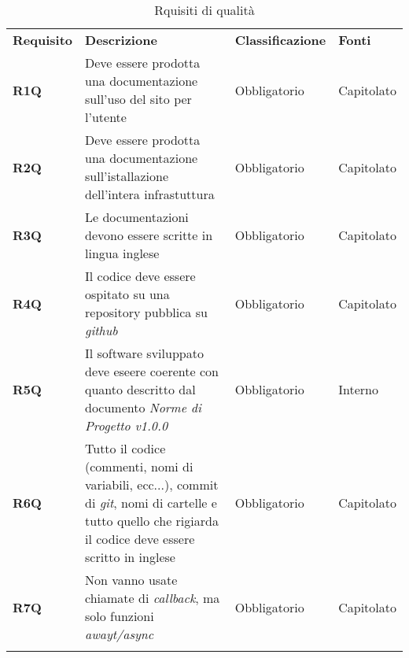 \begin{center}
    \centering
    \renewcommand{\arraystretch}{1.8}
    \label{tab:RequisitiQualita}
    \begin{longtable}[!h]{p{50px} p{200px} p{100px} p{50px}}
        \rowcolor{logo!70} \textbf{Requisito} & \textbf{Descrizione}                                                                                                                                        & \textbf{Classificazione} & \textbf{Fonti} \\
        \textbf{R1Q}                          & Deve essere prodotta una documentazione sull'uso del sito per l'utente                                                                                      & Obbligatorio             & Capitolato     \\
        \textbf{R2Q}                          & Deve essere prodotta una documentazione sull'istallazione dell'intera infrastuttura                                                                         & Obbligatorio             & Capitolato     \\
        \textbf{R3Q}                          & Le documentazioni devono essere scritte in lingua inglese                                                                                                   & Obbligatorio             & Capitolato     \\
        \textbf{R4Q}                          & Il codice deve essere ospitato su una repository pubblica su \textit{github}                                                                                        & Obbligatorio             & Capitolato     \\
        \textbf{R5Q}                          & Il software sviluppato deve eseere coerente con quanto descritto dal documento \textit{Norme di Progetto v1.0.0}                                            & Obbligatorio             & Interno        \\
        \textbf{R6Q}                          & Tutto il codice (commenti, nomi di variabili, ecc...), commit di \textit{git}, nomi di cartelle e tutto quello che rigiarda il codice deve essere scritto in inglese & Obbligatorio             & Capitolato     \\
        \textbf{R7Q}                          & Non vanno usate chiamate di \textit{callback}, ma solo funzioni \textit{awayt/async}                                                                        & Obbligatorio             & Capitolato     \\
        \rowcolor{white}\caption{Rquisiti di qualità}
    \end{longtable}
\end{center}

